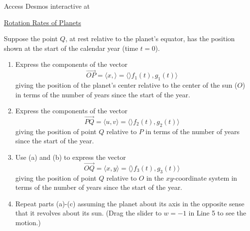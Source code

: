 \documentclass{ximera}
\begin{document}
Access Desmos interactive at
 
\href{https://www.desmos.com/calculator/golluueo9z}{Rotation Rates of Planets}

 
\begin{onlineOnly}
    \begin{center}
\end{center}
\end{onlineOnly}


Suppose the point $Q$, at rest relative to the planet's equator, has the position shown at the start of the calendar year (time $t=0$).
\begin{enumerate}
\item Express the components of the vector
\[
  \overrightarrow{OP}  = \langle x , \rangle =   \langle \rangle f_1(t) , g_1(t) \rangle
\]
giving the position of the planet's center relative to the center of the sun ($O$) in terms of the number of years since the start of the year.

\item Express the components of the vector
 \[
  \overrightarrow{PQ} =  \langle u, v \rangle =   \langle \rangle f_2(t) , g_2(t) \rangle
\]
giving the position of point $Q$ relative to $P$ in terms of the number of years since the start of the year.

\item Use (a) and (b) to express the vector 
\[
  \overrightarrow{OQ} =  \langle x, y \rangle =   \langle \rangle f_3(t) , g_3(t) \rangle
\]
giving the position of point $Q$ relative to $O$ in the $xy$-coordinate system in terms of the number of years since the start of the year.

\item Repeat parts (a)-(c) assuming the planet about its axis in the opposite sense that it revolves about its sun. (Drag the slider to $w=-1$ in Line 5 to see the motion.)
\end{enumerate}
\end{document}
